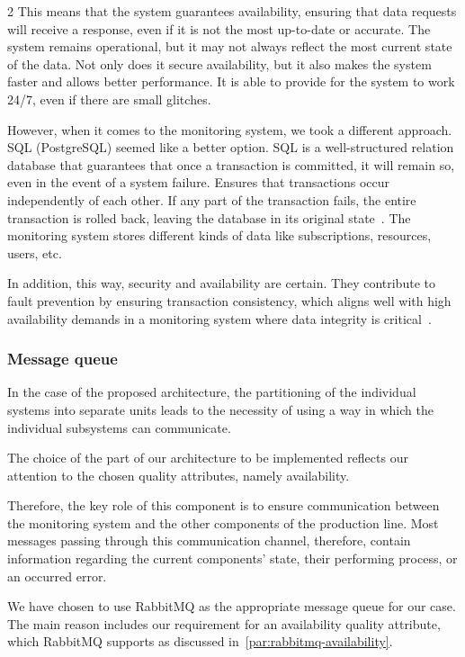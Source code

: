 \documentclass{article}
\begin{document}
\begin{multicols}{2}
This means that the system guarantees availability, ensuring that data requests will receive a response, even if it is not the most up-to-date or accurate. The system remains operational, but it may not always reflect the most current state of the data. Not only does it secure availability, but it also makes the system faster and allows better performance. It is able to provide for the system to work 24/7, even if there are small glitches. 

However, when it comes to the monitoring system, we took a different approach. SQL (PostgreSQL) seemed like a better option. SQL is a well-structured relation database that guarantees that once a transaction is committed, it will remain so, even in the event of a system failure. Ensures that transactions occur independently of each other. If any part of the transaction fails, the entire transaction is rolled back, leaving the database in its original state~\cite{b2}. The monitoring system stores different kinds of data like subscriptions, resources, users, etc. 

In addition, this way, security and availability are certain. They contribute to fault prevention by ensuring transaction consistency, which aligns well with high availability demands in a monitoring system where data integrity is critical~\cite{b1}.

\subsubsection{Message queue}
In the case of the proposed architecture, the partitioning of the individual systems into separate units leads to the necessity of using a way in which the individual subsystems can communicate.

The choice of the part of our architecture to be implemented reflects our attention to the chosen quality attributes, namely availability.

Therefore, the key role of this component is to ensure communication between the monitoring system and the other components of the production line. Most messages passing through this communication channel, therefore, contain information regarding the current components' state, their performing process, or an occurred error. 

We have chosen to use RabbitMQ as the appropriate message queue for our case. The main reason includes our requirement for an availability quality attribute, which RabbitMQ supports as discussed in~\ref{par:rabbitmq-availability}.


\end{multicols}
\end{document}
